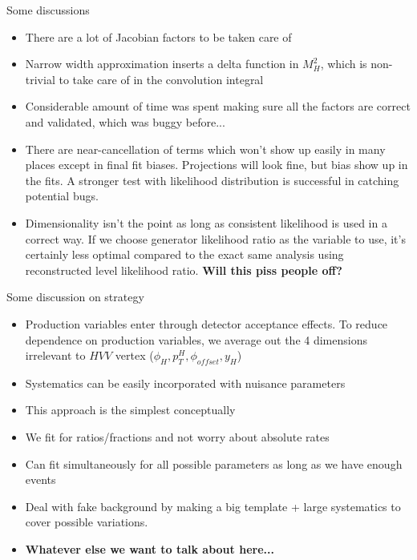 \documentclass[11pt,t]{beamer}
\begin{document}
\begin{frame}{Some discussions}
   \begin{itemize}
   \item There are a lot of Jacobian factors to be taken care of
   \item Narrow width approximation inserts a delta function in $M_H^2$, which is non-trivial to take care of in the convolution integral
   \item Considerable amount of time was spent making sure all the factors are correct and validated, which was buggy before...
   \item There are near-cancellation of terms which won't show up easily in many places except in final fit biases.
   Projections will look fine, but bias show up in the fits.
   A stronger test with likelihood distribution is successful in catching potential bugs.
   \item Dimensionality isn't the point as long as consistent likelihood is used in a correct way.
   If we choose generator likelihood ratio as the variable to use, it's certainly less optimal
   compared to the exact same analysis using reconstructed level likelihood ratio.
   \textbf{Will this piss people off?}
   \end{itemize}
\end{frame}

\begin{frame}{Some discussion on strategy}
   \begin{itemize}
   \item Production variables enter through detector acceptance effects.  To reduce dependence on
   production variables, we average out the 4 dimensions irrelevant to $HVV$ vertex ($\phi_H, p_T^H, \phi_{offset}, y_H$)
   \item Systematics can be easily incorporated with nuisance parameters
   \item This approach is the simplest conceptually
   \item We fit for ratios/fractions and not worry about absolute rates
   \item Can fit simultaneously for all possible parameters as long as we have enough events
   \item Deal with fake background by making a big template + large systematics to cover possible variations.
   \item \textbf{Whatever else we want to talk about here...}
   \end{itemize}
\end{frame}
\end{document}
